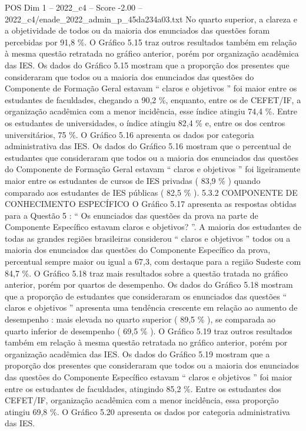 \begin{textsample}{POS Dim 1 – 2022\_c4 – Score -2.00 – 2022\_c4/enade\_2022\_admin\_p\_45da234a03.txt}
No quarto superior, a clareza e a objetividade de todos ou da maioria dos enunciados das questões foram percebidas por 91,8 \%.
O Gráfico 5.15 traz outros resultados também em relação à mesma questão retratada no gráfico anterior, porém por organização acadêmica das IES.
Os dados do Gráfico 5.15 mostram que a proporção dos presentes que consideraram que todos ou a maioria dos enunciados das questões do Componente de Formação Geral estavam “ claros e objetivos ” foi maior entre os estudantes de faculdades, chegando a 90,2 \%, enquanto, entre os de CEFET/IF, a organização acadêmica com a menor incidência, esse índice atingiu 74,4 \%.
Entre os estudantes de universidades, o índice atingiu 82,4 \% e, entre os dos centros universitários, 75 \%.
O Gráfico 5.16 apresenta os dados por categoria administrativa das IES.
Os dados do Gráfico 5.16 mostram que o percentual de estudantes que consideraram que todos ou a maioria dos enunciados das questões do Componente de Formação Geral estavam “ claros e objetivos ” foi ligeiramente maior entre os estudantes de cursos de IES privadas ( 83,9 \% ) quando comparado aos estudantes de IES públicas ( 82,5 \% ). 5.3.2 COMPONENTE DE CONHECIMENTO ESPECÍFICO O Gráfico 5.17 apresenta as respostas obtidas para a Questão 5 : “ Os enunciados das questões da prova na parte de Componente Específico estavam claros e objetivos? ”.
A maioria dos estudantes de todas as grandes regiões brasileiras considerou “ claros e objetivos ” todos ou a maioria dos enunciados das questões do Componente Específico da prova, percentual sempre maior ou igual a 67,3, com destaque para a região Sudeste com 84,7 \%.
O Gráfico 5.18 traz mais resultados sobre a questão tratada no gráfico anterior, porém por quartos de desempenho.
Os dados do Gráfico 5.18 mostram que a proporção de estudantes que consideraram os enunciados das questões “ claros e objetivos ” apresenta uma tendência crescente em relação ao aumento de desempenho : mais elevada no quarto superior ( 89,5 \% ), se comparada ao quarto inferior de desempenho ( 69,5 \% ).
O Gráfico 5.19 traz outros resultados também em relação à mesma questão retratada no gráfico anterior, porém por organização acadêmica das IES.
Os dados do Gráfico 5.19 mostram que a proporção dos presentes que consideraram que todos ou a maioria dos enunciados das questões do Componente Específico estavam “ claros e objetivos ” foi maior entre os estudantes de faculdades, atingindo 85,2 \%.
Entre os estudantes dos CEFET/IF, organização acadêmica com a menor incidência, essa proporção atingiu 69,8 \%.
O Gráfico 5.20 apresenta os dados por categoria administrativa das IES.

\end{textsample}
